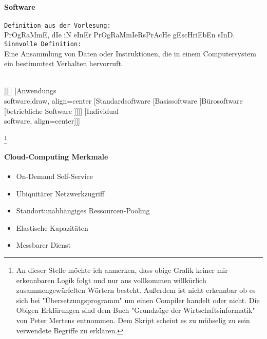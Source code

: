 \documentclass[twocolumn]{article}
\begin{document}
\paragraph{Software}
	\texttt{Definition aus der Vorlesung:} \\ 
	PrOgRaMmE, dIe iN eInEr PrOgRaMmIeRsPrAcHe gEscHriEbEn sInD. \\
	\texttt{Sinnvolle Definition:} \\
	Eine Ansammlung von Daten oder Instruktionen, die in einem Computersystem ein bestimmtest Verhalten hervorruft. \\\\
	\begin{flushleft}

	\begin{forest}
	[Software,draw 			
	[Systemsoftware,draw 
		[Betriebssystem
		[Übersetzungsprogramm \footnotemark
		[Dienstprogramme \footnotemark
		[Protokolle\footnotemark und Treiber\footnotemark ]]]]]
	[Anwendungs\\software,draw, align=center
		[Standardsoftware 
		[Basissoftware 
		[Bürosoftware 
		[betriebliche Software ]]]] 
		[Individual\\software, align=center]]]
	\end{forest}
	\end{flushleft}
\footnote{An dieser Stelle möchte ich anmerken, dass obige Grafik keiner mir erkennbaren Logik folgt und nur aus vollkommen willkürlich zusammengewürfelten Wörtern besteht. Außerdem ist nicht erkennbar ob es sich bei "Übersetzungsprogramm" um einen Compiler handelt oder nicht. Die Obigen Erklärungen sind dem Buch "Grundzüge der Wirtschaftsinformatik" von Peter Mertens entnommen. Dem Skript scheint es zu mühselig zu sein verwendete Begriffe zu erklären.}
\paragraph{Cloud-Computing Merkmale}
	\begin{itemize}
		\item On-Demand Self-Service
		\item Ubiquitärer Netzwerkzugriff
		\item Standortunabhängiges Ressourcen-Pooling
		\item Elastische Kapazitäten
		\item Messbarer Dienst
	\end{itemize}
\end{document}
